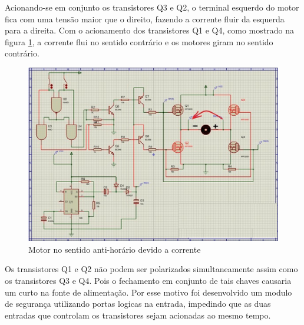 Acionando-se em conjunto os transistores Q3 e Q2, o terminal esquerdo do motor fica com uma tensão maior que o direito, fazendo a corrente fluir da esquerda para a direita. Com o acionamento dos transistores Q1 e Q4, como mostrado na figura \ref{figx+3}, a corrente flui no sentido contrário e os motores giram no sentido contrário.

\begin{figure}[!htb]
	\centering
	\includegraphics[keepaspectratio=true,scale=1]{figuras/referencialteorico/figurax_3.eps}
	\caption{Motor no sentido anti-horário devido a corrente}
	\label{figx+3}
\end{figure}

Os transistores Q1 e Q2 não podem ser polarizados simultaneamente assim como os transistores Q3 e Q4. Pois o fechamento em conjunto de tais chaves causaria um curto na fonte de alimentação. Por esse motivo foi desenvolvido um modulo de segurança utilizando portas logicas na entrada, impedindo que as duas entradas que controlam os transistores sejam acionadas ao mesmo tempo.
